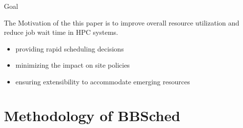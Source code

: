 \documentclass[aspectratio=1610]{beamer}
\begin{document}
\begin{frame}{Goal}

    The Motivation of the this paper is to improve overall resource utilization and reduce job wait time in HPC systems.

    \begin{itemize}
        \item providing rapid scheduling decisions
        \item minimizing the impact on site policies
        \item ensuring extensibility to accommodate emerging resources
    \end{itemize}
   
\end{frame}

\section{Methodology of BBSched}

\begin{frame}{}
    
\end{frame}
\end{document}
